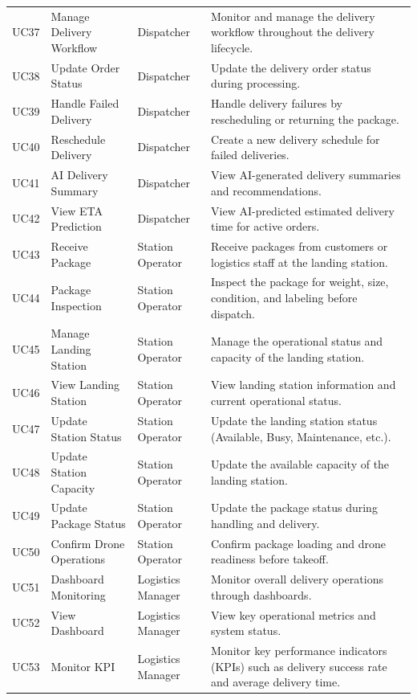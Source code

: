 \begin{longtable}{@{}p{1.3cm}p{3cm}p{2.7cm}p{6.5cm}@{}}
UC37 & Manage Delivery Workflow & Dispatcher & Monitor and manage the delivery workflow throughout the delivery lifecycle. \\
UC38 & Update Order Status & Dispatcher & Update the delivery order status during processing. \\
UC39 & Handle Failed Delivery & Dispatcher & Handle delivery failures by rescheduling or returning the package. \\
UC40 & Reschedule Delivery & Dispatcher & Create a new delivery schedule for failed deliveries. \\
UC41 & AI Delivery Summary & Dispatcher & View AI-generated delivery summaries and recommendations. \\
UC42 & View ETA Prediction & Dispatcher & View AI-predicted estimated delivery time for active orders. \\
UC43 & Receive Package & Station Operator & Receive packages from customers or logistics staff at the landing station. \\
UC44 & Package Inspection & Station Operator & Inspect the package for weight, size, condition, and labeling before dispatch. \\
UC45 & Manage Landing Station & Station Operator & Manage the operational status and capacity of the landing station. \\
UC46 & View Landing Station & Station Operator & View landing station information and current operational status. \\
UC47 & Update Station Status & Station Operator & Update the landing station status (Available, Busy, Maintenance, etc.). \\
UC48 & Update Station Capacity & Station Operator & Update the available capacity of the landing station. \\
UC49 & Update Package Status & Station Operator & Update the package status during handling and delivery. \\
UC50 & Confirm Drone Operations & Station Operator & Confirm package loading and drone readiness before takeoff. \\
UC51 & Dashboard Monitoring & Logistics Manager & Monitor overall delivery operations through dashboards. \\
UC52 & View Dashboard & Logistics Manager & View key operational metrics and system status. \\
UC53 & Monitor KPI & Logistics Manager & Monitor key performance indicators (KPIs) such as delivery success rate and average delivery time. \\

\end{longtable}
